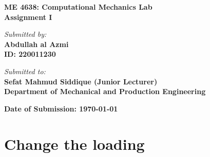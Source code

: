 \documentclass{article}
\begin{document}
\begin{titlepage}
	\begin{center}
		\vspace*{2cm}
		{\Huge \textbf{ ME 4638: Computational Mechanics Lab}} \\
		\vspace{1cm}
		\Large{\textbf{Assignment I}} \\

		\vfill

		\textit{\large Submitted by:} \\
		\vspace{0.3cm}
		\textbf{Abdullah al Azmi} \\
		\textbf{ID: 220011230} \\

		\vfill

		\textit{\large Submitted to:} \\
		\vspace{0.3cm}
		\textbf{\Large Sefat Mahmud Siddique (Junior Lecturer)} \\
		\textbf{Department of Mechanical and Production Engineering} \\

		\vfill

		\textbf{Date of Submission: \today}
		\vspace*{1cm}
	\end{center}
\end{titlepage}

\newpage

\setcounter{section}{2}

\section{Change the loading}
\end{document}
